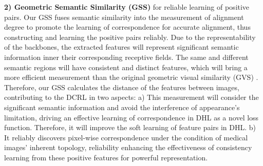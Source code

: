 \textbf{2) Geometric Semantic Similarity (GSS)} for reliable learning of positive pairs. Our GSS fuses semantic similarity into the measurement of alignment degree to promote the learning of correspondence for accurate alignment, thus constructing and learning the positive pairs reliably. Due to the representability of the backbones, the extracted features will represent significant semantic information inner their corresponding receptive fields. The same and different semantic regions will have consistent and distinct features, which will bring a more efficient measurement than the original geometric visual similarity (GVS) \cite{He_2023_CVPR}. Therefore, our GSS calculates the distance of the features between images, contributing to the DCRL in two aspects: a) This measurement will consider the significant semantic information and avoid the interference of appearance's limitation, driving an effective learning of correspondence in DHL as a novel loss function. Therefore, it will improve the soft learning of feature pairs in DHL. b) It reliably discovers pixel-wise correspondence under the condition of medical images' inherent topology, reliability enhancing the effectiveness of consistency learning from these positive features for powerful representation.

